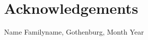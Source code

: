 \thispagestyle{plain}			%
\section*{Acknowledgements}
 
\vspace{1.5cm}
\hfill
Name Familyname, Gothenburg, Month Year

\newpage				%
\thispagestyle{empty}
\mbox{}